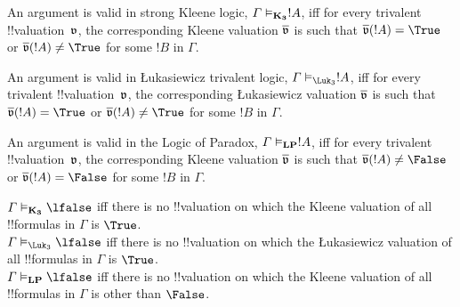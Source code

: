 \documentclass[../../../include/open-logic-section]{subfiles}
\begin{document}
\begin{defn}
An argument is valid in strong Kleene logic, $\Gamma \Entails[\Log{K_3}] !A$, iff for every trivalent !!{valuation}~$\pAssign{v}$, the corresponding Kleene valuation $\pValue{v}$ is such that $\pValue{v}(!A) = \True$ or $\pValue{v}(!A) \neq \True$ for some $!B$ in $\Gamma$.
\end{defn}

\begin{defn}
An argument is valid in Łukasiewicz trivalent logic, $\Gamma \Entails[\Log \Luk_3] !A$, iff for every trivalent !!{valuation}~$\pAssign{v}$, the corresponding Łukasiewicz valuation $\pValue{v}$ is such that $\pValue{v}(!A) = \True$ or  $\pValue{v}(!A) \neq \True$ for some $!B$ in $\Gamma$. 
\end{defn}

\begin{defn}
An argument is valid in the Logic of Paradox, $\Gamma \Entails[\Log{LP}] !A$, iff for every trivalent !!{valuation}~$\pAssign{v}$, the corresponding Kleene valuation $\pValue{v}$ is such that $\pValue{v}(!A) \neq \False$ or $\pValue{v}(!A) = \False$ for some $!B$ in $\Gamma$.
\end{defn}

\begin{prop}
$\Gamma \Entails[\Log{K_3}] \lfalse$ iff there is no !!{valuation} on which the Kleene valuation of all !!{formula}s in $\Gamma$ is $\True$.\\
$\Gamma \Entails[\Log \Luk_3] \lfalse$ iff there is no !!{valuation} on which the Łukasiewicz valuation of all !!{formula}s in $\Gamma$ is $\True$.\\
$\Gamma \Entails[\Log{LP}] \lfalse$ iff there is no !!{valuation} on which the Kleene valuation of all !!{formula}s in $\Gamma$ is other than $\False$. 
\end{prop}
\end{document}
